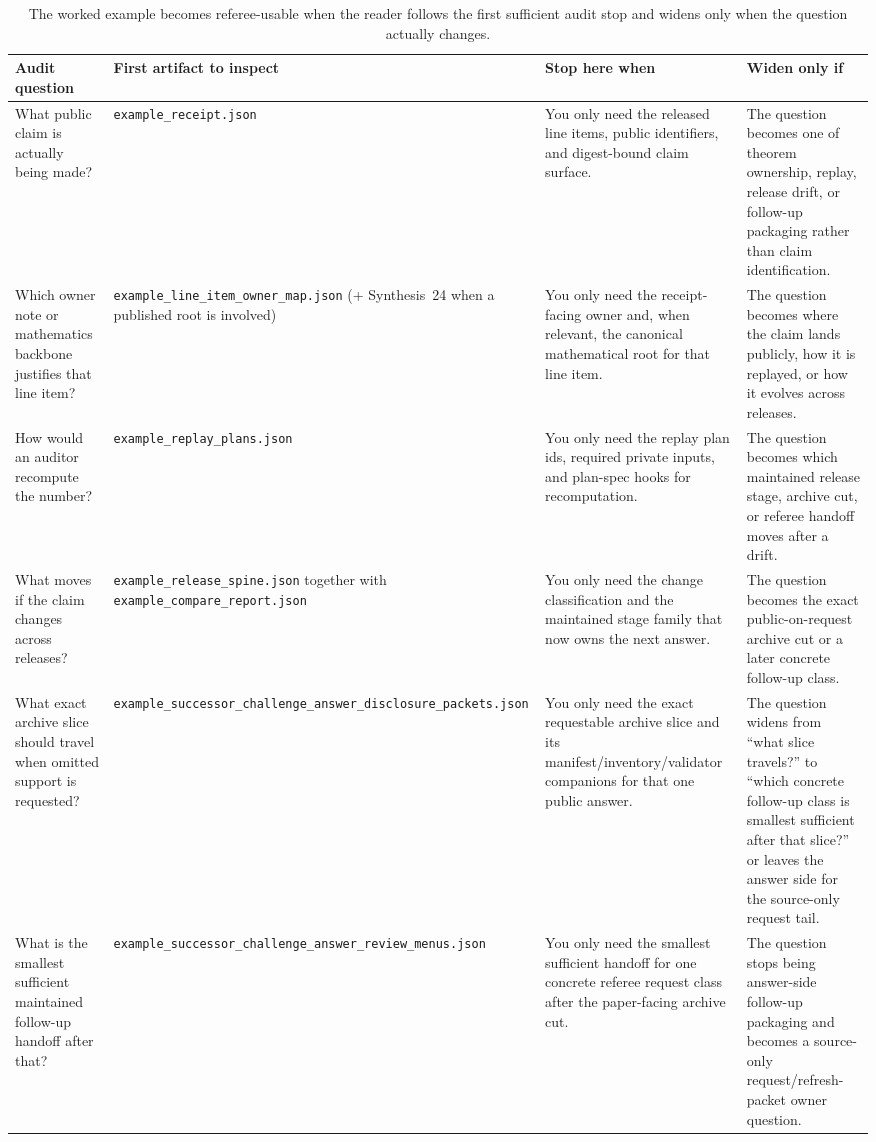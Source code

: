 \documentclass[11pt]{article}
\begin{document}
\begin{table}[ht]
\centering
\small
\begin{tabularx}{\linewidth}{@{}Y Y Y Y@{}}
\toprule
Audit question & First artifact to inspect & Stop here when & Widen only if \\
\midrule
What public claim is actually being made? & \texttt{example\_receipt.json} & You only need the released line items, public identifiers, and digest-bound claim surface. & The question becomes one of theorem ownership, replay, release drift, or follow-up packaging rather than claim identification. \\
Which owner note or mathematics backbone justifies that line item? & \texttt{example\_line\_item\_owner\_map.json} (+ Synthesis~24 when a published root is involved) & You only need the receipt-facing owner and, when relevant, the canonical mathematical root for that line item. & The question becomes where the claim lands publicly, how it is replayed, or how it evolves across releases. \\
How would an auditor recompute the number? & \texttt{example\_replay\_plans.json} & You only need the replay plan ids, required private inputs, and plan-spec hooks for recomputation. & The question becomes which maintained release stage, archive cut, or referee handoff moves after a drift. \\
What moves if the claim changes across releases? & \texttt{example\_release\_spine.json} together with \texttt{example\_compare\_report.json} & You only need the change classification and the maintained stage family that now owns the next answer. & The question becomes the exact public-on-request archive cut or a later concrete follow-up class. \\
What exact archive slice should travel when omitted support is requested? & \texttt{example\_successor\_challenge\_answer\_disclosure\_packets.json} & You only need the exact requestable archive slice and its manifest/inventory/validator companions for that one public answer. & The question widens from ``what slice travels?'' to ``which concrete follow-up class is smallest sufficient after that slice?'' or leaves the answer side for the source-only request tail. \\
What is the smallest sufficient maintained follow-up handoff after that? & \texttt{example\_successor\_challenge\_answer\_review\_menus.json} & You only need the smallest sufficient handoff for one concrete referee request class after the paper-facing archive cut. & The question stops being answer-side follow-up packaging and becomes a source-only request/refresh-packet owner question. \\
\bottomrule
\end{tabularx}
\caption{The worked example becomes referee-usable when the reader follows the first sufficient audit stop and widens only when the question actually changes.}
\label{tab:workedexample-auditwalk}
\end{table}
\end{document}
